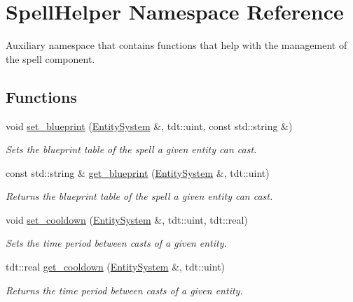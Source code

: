 \hypertarget{namespace_spell_helper}{}\section{Spell\+Helper Namespace Reference}
\label{namespace_spell_helper}


Auxiliary namespace that contains functions that help with the management of the spell component.  


\subsection*{Functions}
\begin{DoxyCompactItemize}
\item 
void \hyperlink{namespace_spell_helper_af557b45af08b57af55d31d2e8e9b07a8}{set\+\_\+blueprint} (\hyperlink{class_entity_system}{Entity\+System} \&, tdt\+::uint, const std\+::string \&)
\begin{DoxyCompactList}\small\item\em Sets the blueprint table of the spell a given entity can cast. \end{DoxyCompactList}\item 
const std\+::string \& \hyperlink{namespace_spell_helper_a288ab4014e3af9f11c5617af16668608}{get\+\_\+blueprint} (\hyperlink{class_entity_system}{Entity\+System} \&, tdt\+::uint)
\begin{DoxyCompactList}\small\item\em Returns the blueprint table of the spell a given entity can cast. \end{DoxyCompactList}\item 
void \hyperlink{namespace_spell_helper_ae1e47f32e5c9e0eab148227f3a12828d}{set\+\_\+cooldown} (\hyperlink{class_entity_system}{Entity\+System} \&, tdt\+::uint, tdt\+::real)
\begin{DoxyCompactList}\small\item\em Sets the time period between casts of a given entity. \end{DoxyCompactList}\item 
tdt\+::real \hyperlink{namespace_spell_helper_a6b96cc74dedd24d48fedd4869063f9e2}{get\+\_\+cooldown} (\hyperlink{class_entity_system}{Entity\+System} \&, tdt\+::uint)
\begin{DoxyCompactList}\small\item\em Returns the time period between casts of a given entity. \end{DoxyCompactList}\item 

\end{DoxyCompactItemize}
